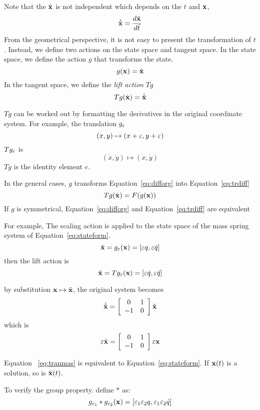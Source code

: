 Note that the $\dot{\mathbf{x}}$ is not independent which depends on the $t$ and $\mathbf{x}$,
\[
\dot{\tilde{\mathbf{x}}}=\frac{d \tilde{\mathbf{x}} }{d \tilde{t}}
\]
From the geometrical perspective, it is not easy to present  the transformation of $t$.
Instead, we define two actions on the state space and tangent space.
In the state space, we define the  action $g$ that transforms the state. 
\[
g(\mathbf{x})=\tilde{\mathbf{x}}
\]
In the tangent space, we define the \emph{lift action} $Tg$ 
\[
Tg(\dot{\mathbf{x}})=\dot{\tilde{\mathbf{x}}}
\]

$Tg$ can be worked out by formatting the derivatives in the original coordinate system.
For example, the translation $g_{\varepsilon}$ 
\[
(x,y)\mapsto (x+\varepsilon,y+\varepsilon)
\]
$Tg_{\varepsilon}$ is
\[
(\dot{x},\dot{y}) \mapsto (\dot{x},\dot{y})
\]
$Tg$ is the identity element $e$.


In the general cases, $g$ transforms Equation~\ref{eq:difforg} into Equation~\ref{eq:trdiff}
\begin{equation}
\label{eq:trdiff}
Tg(\dot{\mathbf{x}})=F(g(\mathbf{x}))
\end{equation}
If $g$ is symmetrical, Equation~\ref{eq:difforg} and Equation~\ref{eq:trdiff} are equivalent







 	
For example, 
The scaling action is applied to the state space of the mass spring system of Equation~\ref{eq:stateform}. 
\[
\tilde{\mathbf{x}}=g_{\varepsilon}(\mathbf{x})=[\varepsilon q, \varepsilon \dot{q} ]
\]
then the lift action is
\[
\tilde{\mathbf{x}}=Tg_{\varepsilon}(\mathbf{x})=[\varepsilon \dot{q}, \varepsilon \ddot{q}]
\]



by substitution $\mathbf{x} \mapsto \tilde{\mathbf{x}}$, the original system becomes
\[ 
\dot{\tilde{\mathbf{x}}}=
\left[ 
\begin{array}{cc}
0 &1\\
-1 &0 
\end{array}
\right]\tilde{\mathbf{x}}
\]
which is 
\begin{equation}
\label{eq:tranmas} 
\varepsilon \dot{\mathbf{x}}=
\left[ 
\begin{array}{cc}
0 &1\\
-1 &0 
\end{array}
\right]\varepsilon \mathbf{x}
\end{equation}

Equation ~\ref{eq:tranmas} is equivalent to  Equation~\ref{eq:stateform}.
If $\mathbf{x}(t)$ is a solution, so is $\tilde{\mathbf{x}}(t)$.

To verify the group property. define $*$ as:
\[
g_{\varepsilon_1}*g_{\varepsilon_2}(\mathbf{x})=[\varepsilon_1 \varepsilon_2 q, \varepsilon_1 \varepsilon_2 \dot{q}]
\]

